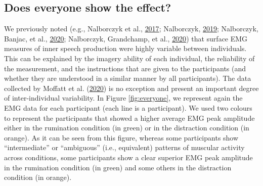 \documentclass[
  english,
  man, donotrepeattitle,floatsintext]{apa6}
\begin{document}
\hypertarget{does-everyone-show-the-effect}{%
\subsection{Does everyone show the effect?}\label{does-everyone-show-the-effect}}

We previously noted (e.g., Nalborczyk et al., \protect\hyperlink{ref-nalborczyk_orofacial_2017}{2017}; Nalborczyk, \protect\hyperlink{ref-nalborczyk_understanding_2019}{2019}; Nalborczyk, Banjac, et al., \protect\hyperlink{ref-nalborczyk_dissociating_2020}{2020}; Nalborczyk, Grandchamp, et al., \protect\hyperlink{ref-nalborczyk_can_2020}{2020}) that surface EMG measures of inner speech production were highly variable between individuals. This can be explained by the imagery ability of each individual, the reliability of the measurement, and the instructions that are given to the participants (and whether they are understood in a similar manner by all participants). The data collected by Moffatt et al. (\protect\hyperlink{ref-moffatt_inner_2020}{2020}) is no exception and present an important degree of inter-individual variability. In Figure \ref{fig:everyone}, we represent again the EMG data for each participant (each line is a participant). We used two colours to represent the participants that showed a higher average EMG peak amplitude either in the rumination condition (in green) or in the distraction condition (in orange). As it can be seen from this figure, whereas some participants show ``intermediate'' or ``ambiguous'' (i.e., equivalent) patterns of muscular activity across conditions, some participants show a clear superior EMG peak amplitude in the rumination condition (in green) and some others in the distraction condition (in orange).
\end{document}
